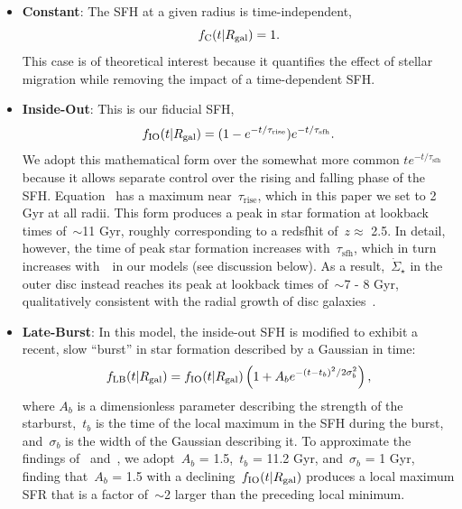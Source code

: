 \documentclass[draft2.tex]{subfiles}
\begin{document}
\begin{itemize} 
	\item \textbf{Constant}: The SFH at a given radius is time-independent, 
	\begin{equation} 
	f_\text{C}(t|R_\text{gal}) = 1. 
	\label{eq:constant_sfh} 
	\end{equation} 
	This case is of theoretical interest because it quantifies the effect of 
	stellar migration while removing the impact of a time-dependent SFH. 

	\item \textbf{Inside-Out}: This is our fiducial SFH, 
	\begin{equation} 
	f_\text{IO}(t|R_\text{gal}) = (1 - e^{-t / \tau_\text{rise}}) 
	e^{-t / \tau_\text{sfh}}. 
	\label{eq:insideout_sfh} 
	\end{equation} 
	We adopt this mathematical form over the somewhat more common 
	$te^{-t/\tau_\text{sfh}}$ because it allows separate control over the 
	rising and falling phase of the SFH. 
	Equation~ has a maximum near~$\tau_\text{rise}$, 
	which in this paper we set to 2 Gyr at all radii. 
	This form produces a peak in star formation at lookback times of~$\sim$11 
	Gyr, roughly corresponding to a redsfhit of~$z \approx$ 2.5. 
	In detail, however, the time of peak star formation increases 
	with~$\tau_\text{sfh}$, which in turn increases with~\rgal~in our models 
	(see discussion below). 
	As a result,~$\dot{\Sigma}_\star$ in the outer disc instead reaches its 
	peak at lookback times of~$\sim$7 - 8 Gyr, qualitatively consistent with 
	the radial growth of disc galaxies~\citep{Bird2013, Bird2021, Frankel2019}. 

	\item \textbf{Late-Burst}: In this model, the inside-out SFH is modified to 
	exhibit a recent, slow ``burst'' in star formation described by a Gaussian 
	in time: 
	\begin{equation} 
	f_\text{LB}(t|R_\text{gal}) = f_\text{IO}(t|R_\text{gal}) 
	\left(1 + A_be^{-(t - t_b)^2/2\sigma_b^2}\right), 
	\label{eq:lateburst_sfh} 
	\end{equation} 
	where $A_b$ is a dimensionless parameter describing the strength of the 
	starburst,~$t_b$ is the time of the local maximum in the SFH during the 
	burst, and~$\sigma_b$ is the width of the Gaussian describing it. 
	To approximate the findings of~\citet{Mor2019} and~\citet{Isern2019}, we 
	adopt~$A_b$ = 1.5,~$t_b$ = 11.2 Gyr, and~$\sigma_b$ = 1 Gyr, finding 
	that~$A_b$ = 1.5 with a declining~$f_\text{IO}(t|R_\text{gal})$ produces a local 
	maximum SFR that is a factor of~$\sim$2 larger than the preceding local 
	minimum. 


\end{itemize}
\end{document}
